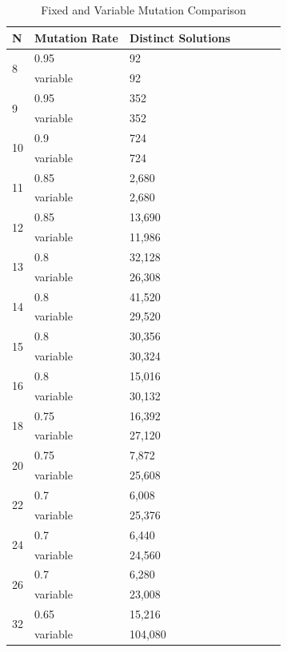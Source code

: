 \documentclass{sig-alternate}
\begin{document}
\begin{table}[!h]
\centering
\caption{Fixed and Variable Mutation Comparison}
\begin{tabular}{|l|l|l|l|l|l|l|} \hline
N&               Mutation Rate&  Distinct Solutions\\ \hline
\multirow{2}{*}{8}&   0.95&           92\\
&                     variable&       92\\ \hline
\multirow{2}{*}{9}&   0.95&           352\\
&                     variable&       352\\ \hline
\multirow{2}{*}{10}&  0.9&            724\\
&                     variable&       724\\ \hline
\multirow{2}{*}{11}&  0.85&           2,680\\
&                     variable&       2,680\\ \hline
\multirow{2}{*}{12}&  0.85&           13,690\\
&                     variable&       11,986\\ \hline
\multirow{2}{*}{13}&  0.8&            32,128\\
&                     variable&       26,308\\ \hline
\multirow{2}{*}{14}&  0.8&            41,520\\
&                     variable&       29,520\\ \hline
\multirow{2}{*}{15}&  0.8&            30,356\\
&                     variable&       30,324\\ \hline
\multirow{2}{*}{16}&  0.8&            15,016\\
&                     variable&       30,132\\ \hline
\multirow{2}{*}{18}&  0.75&           16,392\\
&                     variable&       27,120\\ \hline
\multirow{2}{*}{20}&  0.75&           7,872\\
&                     variable&       25,608\\ \hline
\multirow{2}{*}{22}&  0.7&            6,008\\
&                     variable&       25,376\\ \hline
\multirow{2}{*}{24}&  0.7&            6,440\\
&                     variable&       24,560\\ \hline
\multirow{2}{*}{26}&  0.7&            6,280\\
&                     variable&       23,008\\ \hline
\multirow{2}{*}{32}&  0.65&           15,216\\
&                     variable&       104,080\\
\hline\end{tabular}
\label{table:bestsol}
\end{table}
\end{document}
